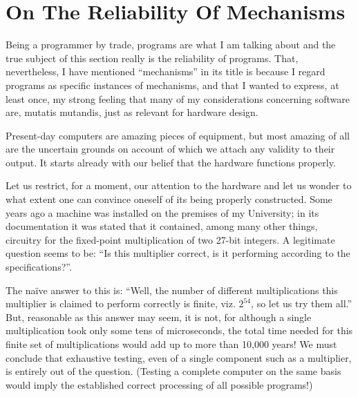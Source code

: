 \section[On the reliability of mechanisms]{On The Reliability Of Mechanisms}
\label{sec:realiability-of-mechanisms}

Being a programmer by trade, programs are what I am talking about and the true subject of this section really is the reliability of programs. That, nevertheless, I have mentioned ``mechanisms'' in its title is because I regard programs as specific instances of mechanisms, and that I wanted to express, at least once, my strong feeling that many of my considerations concerning software are, mutatis mutandis, just as relevant for hardware design.

Present-day computers are amazing pieces of equipment, but most amazing of all are the uncertain grounds on account of which we attach any validity to their output. It starts already with our belief that the hardware functions properly.

Let us restrict, for a moment, our attention to the hardware and let us wonder to what extent one can convince oneself of its being properly constructed. Some years ago a machine was installed on the premises of my University; in its documentation it was stated that it contained, among many other things, circuitry for the fixed-point multiplication of two 27-bit integers. A legitimate question seems to be: ``Is this multiplier correct, is it performing according to the specifications?''.

The naïve answer to this is: ``Well, the number of different multiplications this multiplier is claimed to perform correctly is finite, viz. $2^{54}$, so let us try them all.'' But, reasonable as this answer may seem, it is not, for although a single multiplication took only some tens of microseconds, the total time needed for this finite set of multiplications would add up to more than 10,000 years! We must conclude that exhaustive testing, even of a single component such as a multiplier, is entirely out of the question. (Testing a complete computer on the same basis would imply the established correct processing of all possible programs!)

